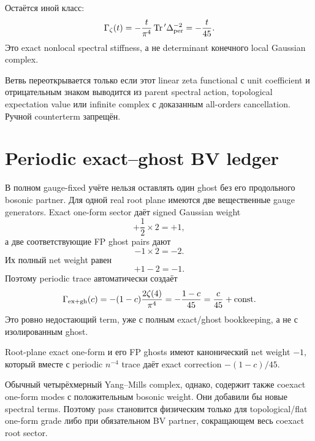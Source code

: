 Остаётся иной класс:
\begin{equation}
 \Gamma_\zeta(t)
 =-\frac{t}{\pi^4}\operatorname{Tr}{}'\Delta_{\rm per}^{-2}
 =-\frac{t}{45}.
\end{equation}
Это exact nonlocal spectral stiffness, а не determinant конечного local
Gaussian complex.

\begin{nogocriterion}
Ветвь переоткрывается только если этот linear zeta functional с unit
coefficient и отрицательным знаком выводится из parent spectral action,
topological expectation value или infinite complex с доказанным all-orders
cancellation. Ручной counterterm запрещён.
\end{nogocriterion}

\section{Periodic exact--ghost BV ledger}

В полном gauge-fixed учёте нельзя оставлять один ghost без его продольного
bosonic partner. Для одной real root plane имеются две вещественные gauge
generators. Exact one-form sector даёт signed Gaussian weight
\begin{equation}
 +\frac12\times2=+1,
\end{equation}
а две соответствующие FP ghost pairs дают
\begin{equation}
 -1\times2=-2.
\end{equation}
Их полный net weight равен
\begin{equation}
 +1-2=-1.
\end{equation}
Поэтому periodic trace автоматически создаёт
\begin{equation}
 \Gamma_{\rm ex+gh}(c)
 =-(1-c)\frac{2\zeta(4)}{\pi^4}
 =-\frac{1-c}{45}
 =\frac{c}{45}+\text{const}.
\end{equation}
Это ровно недостающий term, уже с полным exact/ghost bookkeeping, а не с
изолированным ghost.

\begin{proposition}
Root-plane exact one-form и его FP ghosts имеют канонический net weight
\(-1\), который вместе с periodic \(n^{-4}\) trace даёт exact correction
\(-(1-c)/45\).
\end{proposition}

Обычный четырёхмерный Yang--Mills complex, однако, содержит также coexact
one-form modes с положительным bosonic weight. Они добавили бы новые spectral
terms. Поэтому pass становится физическим только для topological/flat
one-form grade либо при обязательном BV partner, сокращающем весь coexact
root sector.

